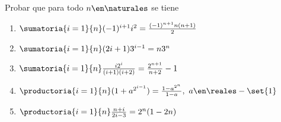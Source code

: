 \begin{enunciado}{\ejercicio}
  Probar que para todo $n \en \naturales$ se tiene
  \begin{multicols}{2}
    \begin{enumerate}[label=\roman*)]
      \item $\sumatoria{i=1}{n} (-1)^{i + 1} i^2 = \frac{(-1)^{n+1} n (n+1)}{2}$
      \item $\sumatoria{i=1}{n} (2i+1)3^{i - 1} = n3^n$
      \item $\sumatoria{i=1}{n} \frac{i2^i}{(i + 1)(i+2)} = \frac{2^{n+1}}{n+2} - 1$
      \item $\productoria{i=1}{n} (1 + a^{2^{i-1}}) = \frac{1 - a^{2^n}}{1 - a},\ a \en \reales - \set{1}$
      \item $\productoria{i=1}{n} \frac{n + i}{2i - 3} = 2^n(1-2n)$
    \end{enumerate}
  \end{multicols}
\end{enunciado}

